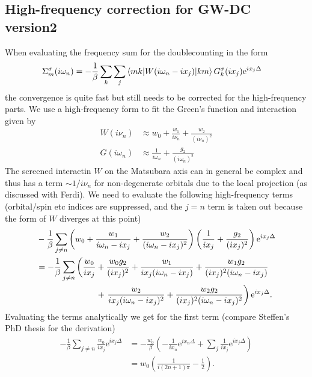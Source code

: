 \documentclass[12pt,a4paper]{scrartcl}
\numberwithin{equation}{section}
\begin{document}
\subsection{High-frequency correction for GW-DC version2}
When evaluating the frequency sum for the doublecounting in the form 
\begin{align}
  \Sigma_m^{\sigma}(i\omega_n) 
%
  &= -\frac{1}{\beta}\sum_k \sum_{j}
   \braket{m k | W(i\omega_n- ix_j )|k m}G^{\sigma}_{k}(ix_j)
   \mathrm{e}^{ix_j \Delta}
\end{align}
the convergence is quite fast but still needs to be corrected
for the high-frequency parts.
We use a high-frequency form to fit the Green's function and interaction
given by
\begin{align}
 W(i\nu_n)    &\approx w_0 + \frac{w_1}{i\nu_n} + \frac{w_2}{(i\nu_n)^2}  \\
 G(i\omega_n) &\approx  \frac{1}{i\omega_n} + \frac{g_2}{(i\omega_n)^2} 
\end{align}
The screened interactin $W$ on the Matsubara axis can in general be complex
and thus has a term $\sim 1/i\nu_n$ for non-degenerate orbitals 
due to the local projection (as discussed with Ferdi).
We need to evaluate the following high-frequency terms (orbital/spin etc indices
are suppressed, and the $j=n$ term is taken out because
the form of $W$ diverges at this point)
\begin{align}
& -\frac{1}{\beta}\sum_{j\neq n} 
  \left( w_0 + \frac{w_1}{i\omega_n -ix_j} + \frac{w_2}{(i\omega_n -ix_j)^2} \right)
  \left( \frac{1}{ix_j} + \frac{g_2}{(ix_j)^2} \right)
   \mathrm{e}^{ix_j \Delta} \\
% 
&= -\frac{1}{\beta} \sum_{j\neq n}
\left( 
  \frac{w_0}{ix_j} + \frac{w_0 g_2}{(ix_j)^2}
+ \frac{w_1}{ix_j(i\omega_n -ix_j)} + \frac{w_1g_2}{(ix_j)^2(i\omega_n -ix_j)}  \right.\nonumber\\
&\hspace{2.5cm}+ \left.\frac{w_2}{ix_j(i\omega_n -ix_j)^2} + \frac{w_2g_2}{(ix_j)^2 (i\omega_n -ix_j)^2}
\right)
\mathrm{e}^{ix_j \Delta}.
\end{align}
Evaluating the terms analytically we get for the first term (compare Steffen's PhD thesis
for the derivation)
\begin{align}
-\frac{1}{\beta} \sum_{j\neq n}  \frac{w_0}{ix_j} \mathrm{e}^{ix_j \Delta}
&= -\frac{w_0}{\beta} \left( -\frac{1}{ix_n} \mathrm{e}^{ix_n \Delta}  + \sum_{j}  \frac{1}{ix_j} \mathrm{e}^{ix_j \Delta}\right) \\
&= w_0 \left( \frac{1}{i(2n+1)\pi} -\frac{1}{2} \right).
\end{align}
\end{document}
